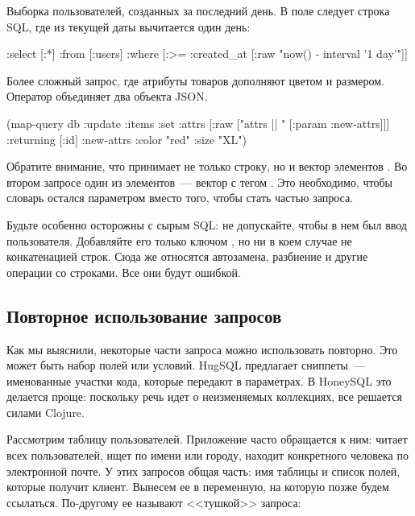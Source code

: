 Выборка пользователей, созданных за последний день. В поле  следует строка SQL, где из текущей даты вычитается один день:

\begin{english}
  \begin{clojure/lines}
{:select [:*]
 :from [:users]
 :where [:>= :created_at
             [:raw "now() - interval '1 day'"]]}
  \end{clojure/lines}
\end{english}

Более сложный запрос, где атрибуты товаров дополняют цветом и размером. Оператор \code{||} объединяет два объекта JSON.

\begin{english}
  \begin{clojure}
(map-query
 db
 {:update :items
  :set {:attrs [:raw ["attrs || " [:param :new-attrs]]]}
  :returning [:id]}
 {:new-attrs {:color "red" :size "XL"}})
  \end{clojure}
\end{english}

Обратите внимание, что  принимает не только строку, но и вектор элементов . Во втором запросе один из элементов~--- вектор с тегом . Это необходимо, чтобы словарь  остался параметром вместо того, чтобы стать частью запроса.

Будьте особенно осторожны с сырым SQL: не допускайте, чтобы в нем был ввод пользователя. Добавляйте его только ключом , но ни в коем случае не конкатенацией строк. Сюда же относятся автозамена, разбиение и другие операции со строками. Все они будут ошибкой.

\subsection{Повторное использование запросов}

Как мы выяснили, некоторые части запроса можно использовать повторно. Это может быть набор полей или условий. HugSQL предлагает сниппеты~--- именованные участки кода, которые передают в параметрах. В HoneySQL это делается проще: поскольку речь идет о неизменяемых коллекциях, все решается силами Clojure.

Рассмотрим таблицу пользователей. Приложение часто обращается к ним: читает всех пользователей, ищет по имени или городу, находит конкретного человека по электронной почте. У этих запросов общая часть: имя таблицы и список полей, которые получит клиент. Вынесем ее в переменную, на которую позже будем ссылаться. По-другому ее называют <<тушкой>> запроса:

